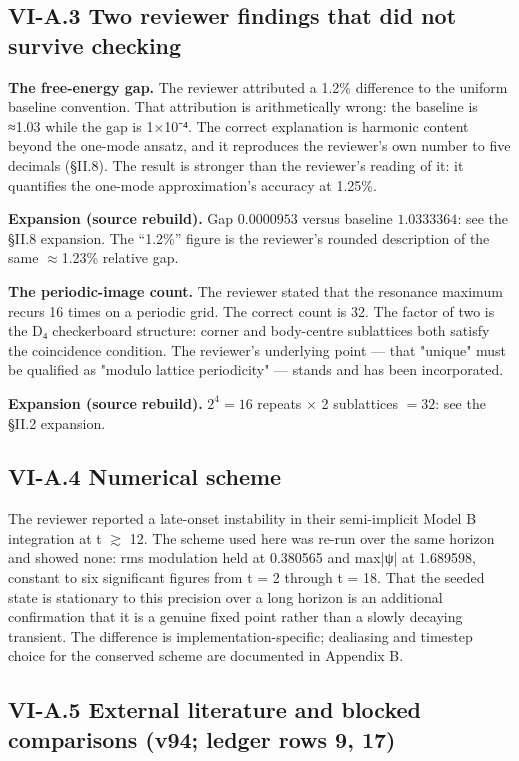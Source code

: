 \documentclass[a4paper,11pt]{article}
\newcommand{\expansion}[1]{\par\smallskip\noindent\textbf{Expansion (source rebuild).} #1\par\smallskip}
\begin{document}
\subsection*{VI-A.3 Two reviewer findings that did not survive checking}

\textbf{The free-energy gap.} The reviewer attributed a 1.2\% difference to the uniform baseline convention. That attribution is arithmetically wrong: the baseline is ≈1.03 while the gap is 1×10⁻⁴. The correct explanation is harmonic content beyond the one-mode ansatz, and it reproduces the reviewer's own number to five decimals (§II.8). The result is stronger than the reviewer's reading of it: it quantifies the one-mode approximation's accuracy at 1.25\%.


\expansion{Gap $0.0000953$ versus baseline $1.0333364$: see the \S II.8 expansion. The ``1.2\%'' figure is the reviewer's rounded description of the same $\approx$1.23\% relative gap.}
\textbf{The periodic-image count.} The reviewer stated that the resonance maximum recurs 16 times on a periodic grid. The correct count is 32. The factor of two is the D₄ checkerboard structure: corner and body-centre sublattices both satisfy the coincidence condition. The reviewer's underlying point — that "unique" must be qualified as "modulo lattice periodicity" — stands and has been incorporated.


\expansion{$2^4 = 16$ repeats $\times$ 2 sublattices $= 32$: see the \S II.2 expansion.}
\subsection*{VI-A.4 Numerical scheme}

The reviewer reported a late-onset instability in their semi-implicit Model B integration at t $\gtrsim$ 12. The scheme used here was re-run over the same horizon and showed none: rms modulation held at 0.380565 and max|ψ| at 1.689598, constant to six significant figures from t = 2 through t = 18. That the seeded state is stationary to this precision over a long horizon is an additional confirmation that it is a genuine fixed point rather than a slowly decaying transient. The difference is implementation-specific; dealiasing and timestep choice for the conserved scheme are documented in Appendix B.

\subsection*{VI-A.5 External literature and blocked comparisons (v94; ledger rows 9, 17)}
\end{document}
